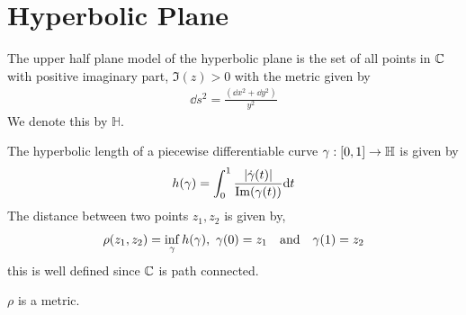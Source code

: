 \section{Hyperbolic Plane}
\begin{definition}
  The upper half plane model of the hyperbolic plane is the set of all points in $\mathbb{C}$ with positive imaginary part, $\Im(z)> 0$ with the metric given by
  \begin{align*}
    \dd s^2 = \frac{(\dd x^2 + \dd y^2)}{y^2}
  \end{align*}
  We denote this by $ \mathbb{H}$. 
\end{definition}

\begin{definition}
  The hyperbolic length of a piecewise differentiable curve $\gamma:[0,1]\to \mathbb{H}$ is given by
  \begin{align*}
    h(\gamma) = \int_0^1 \frac{|\dot{\gamma}(t)|}{\Im(\gamma(t))} \dd t
  \end{align*}
  The distance between two points $z_1, z_2$ is given by,
  \begin{align*}
    \rho(z_1,z_2) = \inf_{\g} h(\gamma),\ \g(0) =z_1 \qq{and} \g(1) = z_2
  \end{align*}
  this is well defined since $\mathbb{C}$ is path connected.
\end{definition}
\begin{proposition}
  $\rho$ is a metric.
\end{proposition}
